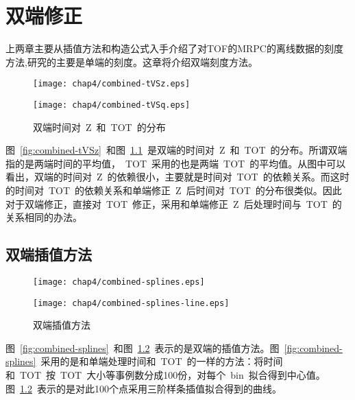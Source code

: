 \chapter{双端修正}
上两章主要从插值方法和构造公式入手介绍了对TOF的MRPC的离线数据的刻度方法,研究的主要是单端的刻度。这章将介绍双端刻度方法。

\begin{figure}[!h]
\begin{minipage}[!h]{0.5\linewidth}
\texttt{[image: chap4/combined-tVSz.eps]}
\label{fig:combined-tVSz}
\end{minipage}%
\hfill
\begin{minipage}[!h]{0.5\linewidth}
\texttt{[image: chap4/combined-tVSq.eps]}
\label{fig:combined-tVSq}
\end{minipage}
\caption{双端时间对~Z~和~TOT~的分布}
\end{figure}

图~\ref{fig:combined-tVSz}~和图~\ref{fig:combined-tVSq}~是双端的时间对~Z~和~TOT~的分布。所谓双端指的是两端时间的平均值，~TOT~采用的也是两端~TOT~的平均值。从图中可以看出，双端的时间对~Z~的依赖很小，主要就是时间对~TOT~的依赖关系。而这时的时间对~TOT~的依赖关系和单端修正~Z~后时间对~TOT~的分布很类似。因此对于双端修正，直接对~TOT~修正，采用和单端修正~Z~后处理时间与~TOT~的关系相同的办法。

\section{双端插值方法}

\begin{figure}[!h]
\begin{minipage}[!h]{0.5\linewidth}
\texttt{[image: chap4/combined-splines.eps]}
\label{fig:combined-splines}
\end{minipage}%
\hfill
\begin{minipage}[!h]{0.5\linewidth}
\texttt{[image: chap4/combined-splines-line.eps]}
\label{fig:combined-splines-line}
\end{minipage}
\caption{双端插值方法}
\end{figure}

图~\ref{fig:combined-splines}~和图~\ref{fig:combined-splines-line}~表示的是双端的插值方法。图~\ref{fig:combined-splines}~采用的是和单端处理时间和~TOT~的一样的方法：将时间和~TOT~按~TOT~大小等事例数分成100份，对每个~bin~拟合得到中心值。图~\ref{fig:combined-splines-line}~表示的是对此100个点采用三阶样条插值拟合得到的曲线。

